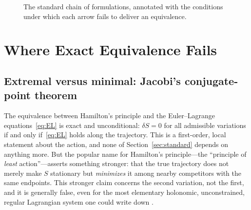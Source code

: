 \documentclass[11pt]{article}
\begin{document}
\begin{figure}[htbp]
\centering
{}
\caption{The standard chain of formulations, annotated with the conditions under which each arrow fails to deliver an equivalence.}
\label{fig:map}
\end{figure}

\section{Where Exact Equivalence Fails}
\label{sec:failures}

\subsection{Extremal versus minimal: Jacobi's conjugate-point theorem}
\label{sec:jacobi}

The equivalence between Hamilton's principle and the Euler--Lagrange equations~\eqref{eq:EL} is exact and unconditional: $\delta S=0$ for all admissible variations if and only if~\eqref{eq:EL} holds along the trajectory. This is a first-order, local statement about the action, and none of Section~\ref{sec:standard} depends on anything more. But the popular name for Hamilton's principle---the ``principle of \emph{least} action''---asserts something stronger: that the true trajectory does not merely make $S$ stationary but \emph{minimizes} it among nearby competitors with the same endpoints. This stronger claim concerns the second variation, not the first, and it is generally false, even for the most elementary holonomic, unconstrained, regular Lagrangian system one could write down \citep{gray2009,graytaylor2007}.
\end{document}
